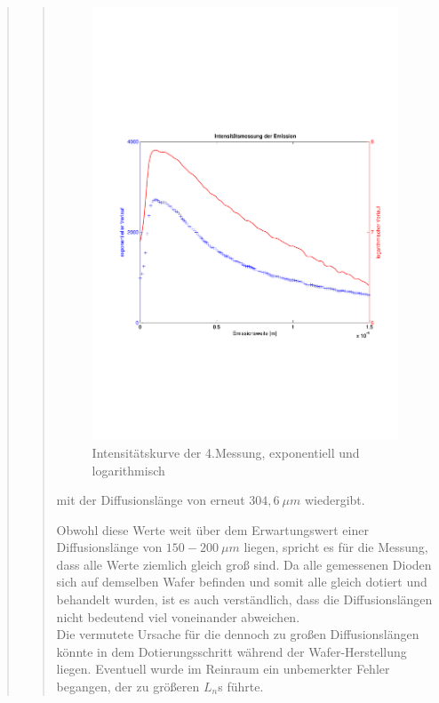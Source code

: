 \begin{quote}
\begin{quote}
        \begin{figure}[H]
                    \centering
                        \includegraphics[scale=0.53, trim = 1cm 6cm 1.5cm 8cm,
                        clip]{./Emissionsbilder/vier/Intensitat_4.pdf}
                        \caption{Intensitätskurve der 4.Messung, exponentiell
                        und logarithmisch}
                            \label{fig:./Emissionsbilder/vier/Intensitatsmessung.pdf}
        \end{figure}

        mit der Diffusionslänge von erneut $304,6\ \mu m$ wiedergibt.

        \vspace{1.5em}

        Obwohl diese Werte weit über dem Erwartungswert einer Diffusionslänge
        von $150 - 200\ \mu m$ liegen, spricht es für die Messung, dass alle
        Werte ziemlich gleich groß sind. Da alle gemessenen Dioden sich auf
        demselben Wafer befinden und somit alle gleich dotiert und behandelt wurden, ist
        es auch verständlich, dass die Diffusionslängen nicht bedeutend viel
        voneinander abweichen.\\
        Die vermutete Ursache für die dennoch zu großen Diffusionslängen könnte
        in dem Dotierungsschritt während der Wafer-Herstellung liegen. Eventuell
        wurde im Reinraum ein unbemerkter Fehler begangen, der zu größeren
        $L_n$s führte.


\end{quote}
\end{quote}
